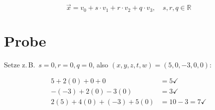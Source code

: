 \documentclass[a4paper,12pt]{article}
\begin{document}
\[
\boxed{\vec{x} = v_0 + s \cdot v_1 + r \cdot v_2 + q \cdot v_3, \quad s, r, q \in \mathbb{R}}
\]

\section*{Probe}

Setze z.\,B.\ $s = 0, r = 0, q = 0$, also $(x,y,z,t,w) = (5,0,-3,0,0)$:

\begin{align*}
5 + 2(0) + 0 + 0 &= 5 \checkmark \\
-(-3) + 2(0) - 3(0) &= 3 \checkmark \\
2(5) + 4(0) + (-3) + 5(0) &= 10 - 3 = 7 \checkmark
\end{align*}
\end{document}
